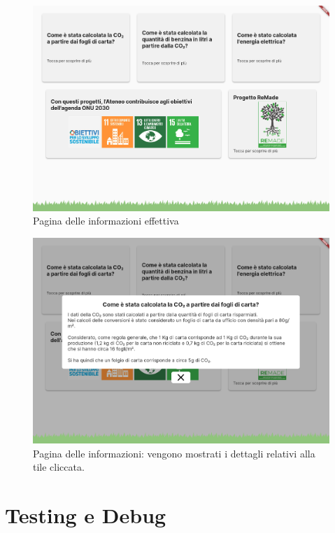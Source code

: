   \begin{figure}[h]
    \centering
    \includegraphics[width=\textwidth]{img/totem/screenshot/infoPageScreen.png}
    \caption{Pagina delle informazioni effettiva}
    \label{fig:infoPage}
  \end{figure}
  \begin{figure}[h]
    \centering
    \includegraphics[width=\textwidth]{img/totem/screenshot/infoPagePopupScreen.png}
    \caption{Pagina delle informazioni: vengono mostrati i dettagli relativi alla tile cliccata.}
    \label{fig:infoPagePopup}
  \end{figure}

\section{Testing e Debug}
